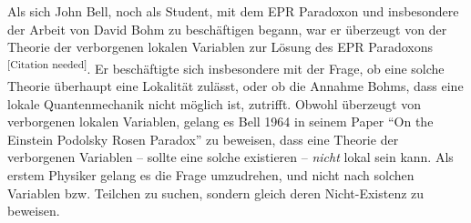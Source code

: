 \begin{refsection}
Als sich John Bell, noch als Student, mit dem EPR Paradoxon und insbesondere
der Arbeit von David Bohm zu besch\"aftigen begann, war er \"uberzeugt von
der Theorie der verborgenen lokalen Variablen zur L\"osung des EPR Paradoxons
\textsuperscript{[Citation needed]}.
Er besch\"aftigte sich insbesondere mit der Frage, ob eine solche Theorie
\"uberhaupt eine Lokalit\"at zul\"asst, oder ob die Annahme Bohms,
dass eine lokale Quantenmechanik nicht m\"oglich ist, zutrifft.
Obwohl \"uberzeugt von verborgenen lokalen Variablen, gelang es Bell 1964
in seinem Paper 
\enquote{On the Einstein Podolsky Rosen Paradox} \cite{Bell:Bell1964}
zu beweisen, dass eine Theorie der verborgenen Variablen -- sollte eine
solche existieren -- \emph{nicht} lokal sein kann.
Als erstem Physiker gelang es die Frage umzudrehen, und nicht nach solchen
Variablen bzw. Teilchen zu suchen, sondern gleich deren Nicht-Existenz
zu beweisen.


\end{refsection}
